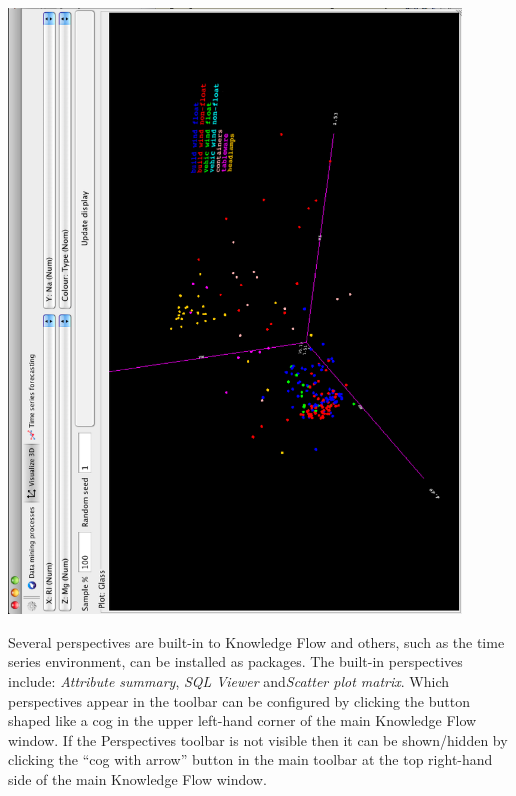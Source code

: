 \begin{center}
  \includegraphics[angle=270,width=12cm]{images/knowledgeflow/scatterPlot3DPerspective.eps}
\end{center}

Several perspectives are built-in to Knowledge Flow and others, such
as the time series environment, can be installed as packages. The
built-in perspectives include: \textit{Attribute summary}, \textit{SQL
  Viewer} and\textit{Scatter plot matrix}. Which perspectives appear
in the toolbar can be configured by clicking the button shaped like a
cog in the upper left-hand corner of the main Knowledge Flow
window. If the Perspectives toolbar is not visible then it can be
shown/hidden by clicking the ``cog with arrow'' button in the main
toolbar at the top right-hand side of the main Knowledge Flow window.
